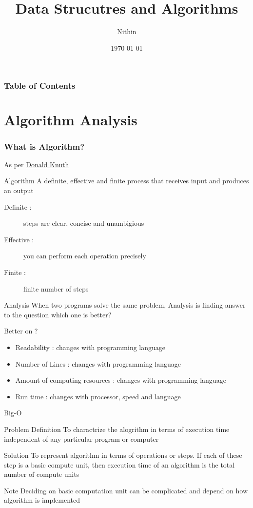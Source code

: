 \documentclass{beamer}
\title{Data Strucutres and Algorithms}
\author{Nithin}
\institute{}
\date{\today}
\begin{document}
\frame{\titlepage}

\begin{frame}
    \frametitle{Table of Contents}
    \tableofcontents
\end{frame}
\section{Algorithm Analysis}
\begin{frame}
\frametitle{What is Algorithm?}
As per \href{https://en.wikipedia.org/wiki/Donald_Knuth}{Donald Knuth}
\begin{alertblock}{Algorithm}
     A definite, effective and finite process that receives input and produces an output
\end{alertblock}
\begin{description}
    \item [Definite :] steps are clear, concise and unambigious
    \item [Effective :] you can perform each operation precisely 
    \item [Finite :] finite number of steps
\end{description}
\begin{alertblock}{Analysis}
    When two programs solve the same problem, Analysis is finding answer to the question which one is \alert{better}?
\end{alertblock}

\end{frame}


\begin{frame}{Better on ?}
    \begin{itemize}
        \item <1-> Readability : \pause changes with programming language \pause
        \item <2-> Number of Lines : \pause changes with programming language \pause
        \item <3-> Amount of computing resources : \pause changes with programming language\pause
        \item <4-> Run time : \pause changes with processor, speed and language \pause
    \end{itemize}
\end{frame}

\begin{frame}{Big-O}
    \begin{block}{Problem Definition}
        To charactrize the alogrithm in terms of  execution time independent of any particular program or computer
    \end{block}
    \pause
    \begin{block}{Solution}
        To represent algorithm in terms of operations or steps. If each of these step is a basic compute unit, then execution time of an algorithm is the total number of compute units
    \end{block}
    \pause
    \begin{alertblock}{Note}
        Deciding on basic computation unit can be complicated and depend on how algorithm is implemented
    \end{alertblock}
\end{frame}
\end{document}
